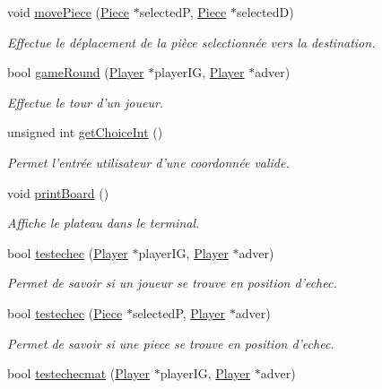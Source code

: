 \begin{DoxyCompactItemize}
void \hyperlink{class_chess_aec36eadf1a550d2f6c85ec8a23bac2d1}{move\-Piece} (\hyperlink{class_piece}{Piece} $\ast$selected\-P, \hyperlink{class_piece}{Piece} $\ast$selected\-D)
\begin{DoxyCompactList}\small\item\em Effectue le déplacement de la pièce selectionnée vers la destination. \end{DoxyCompactList}\item 
bool \hyperlink{class_chess_ac521e181e266322da1664977b102afc5}{game\-Round} (\hyperlink{class_player}{Player} $\ast$player\-I\-G, \hyperlink{class_player}{Player} $\ast$adver)
\begin{DoxyCompactList}\small\item\em Effectue le tour d'un joueur. \end{DoxyCompactList}\item 
unsigned int \hyperlink{class_chess_a7d4dbb556159e245fe753d5a6daada8b}{get\-Choice\-Int} ()
\begin{DoxyCompactList}\small\item\em Permet l'entrée utilisateur d'une coordonnée valide. \end{DoxyCompactList}\item 
void \hyperlink{class_chess_a9cd677e16f4c08ddcdad57a4e12be99f}{print\-Board} ()
\begin{DoxyCompactList}\small\item\em Affiche le plateau dans le terminal. \end{DoxyCompactList}\item 
bool \hyperlink{class_chess_a801d97e9ed968f62b1dd850e11ff3b49}{testechec} (\hyperlink{class_player}{Player} $\ast$player\-I\-G, \hyperlink{class_player}{Player} $\ast$adver)
\begin{DoxyCompactList}\small\item\em Permet de savoir si un joueur se trouve en position d'echec. \end{DoxyCompactList}\item 
bool \hyperlink{class_chess_a48268de47926c93a0c5c906faffa4397}{testechec} (\hyperlink{class_piece}{Piece} $\ast$selected\-P, \hyperlink{class_player}{Player} $\ast$adver)
\begin{DoxyCompactList}\small\item\em Permet de savoir si une piece se trouve en position d'echec. \end{DoxyCompactList}\item 
bool \hyperlink{class_chess_a8bb11009c45ca72877afdddc67c23016}{testechecmat} (\hyperlink{class_player}{Player} $\ast$player\-I\-G, \hyperlink{class_player}{Player} $\ast$adver)

\end{DoxyCompactItemize}
